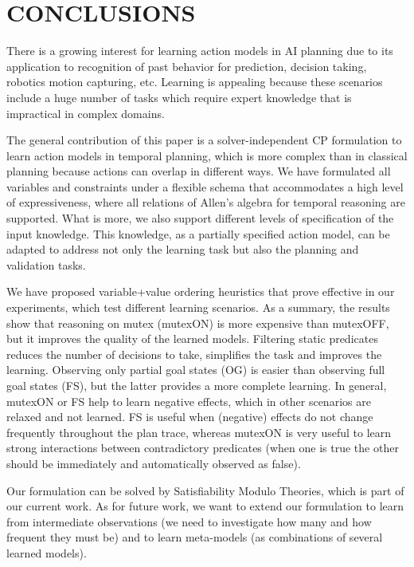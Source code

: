 \documentclass{ecai}
\begin{document}
\section{CONCLUSIONS}
\label{sec:conclusions}

There is a growing interest 
for learning action models in AI planning due to its application to recognition of past behavior for prediction, decision taking, robotics motion capturing, etc. Learning is appealing because these scenarios include a huge number of tasks
which require expert knowledge that is impractical in complex domains.

The general contribution of this paper is a solver-independent CP formulation to learn action models in temporal planning, which is more complex than in classical planning because actions can overlap in different ways.
We have formulated all variables and constraints under a flexible schema that accommodates a high level of expressiveness, where all relations of Allen's algebra for temporal reasoning are supported. 
What is more, we also support different levels of specification of the input knowledge. This knowledge, as a partially specified action model, 
can be adapted to address not only the learning task but also the planning and validation tasks.

We have proposed variable+value ordering heuristics that prove effective in our experiments, which test different learning scenarios.
As a summary, the results show that reasoning on mutex (mutexON) is more expensive than mutexOFF, but it improves the quality of the learned models. Filtering static predicates reduces the number of decisions to take, simplifies the task and improves the learning.
Observing only partial goal states (OG) is easier than observing full goal states (FS), but the latter provides a more complete learning. 
In general, mutexON or FS help to learn negative effects, which in other scenarios are relaxed and not learned.
FS is useful when (negative) effects do not change frequently throughout the plan trace, whereas mutexON is very useful to learn strong interactions between contradictory predicates (when one is true the other should be immediately and automatically observed as false).

Our formulation can be solved by Satisfiability Modulo Theories, which is part of our current work. As for future work, we want to extend our formulation to learn from intermediate observations (we need to investigate how many and how frequent they must be) and to learn meta-models (as combinations of several learned models).








\end{document}
